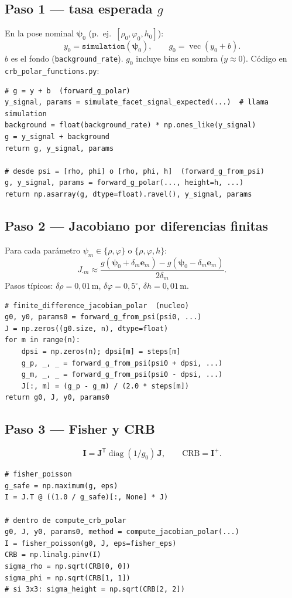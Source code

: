 \documentclass[11pt,a4paper]{article}
\theoremstyle{definition}
\newcommand{\vect}[1]{\boldsymbol{#1}}
\newcommand{\matr}[1]{\mathbf{#1}}
\DeclareMathOperator{\diag}{diag}
\begin{document}
\subsection{Paso 1 --- tasa esperada $g$}
En la pose nominal $\vect{\psi}_0$ (p.\ ej.\ $[\rho_0,\varphi_0,h_0]$):
\[
y_0=\texttt{simulation}(\vect{\psi}_0),\qquad
g_0=\operatorname{vec}(y_0+b).
\]
$b$ es el fondo (\texttt{background\_rate}). $g_0$ incluye bins en sombra
($y\approx 0$). C\'odigo en \texttt{crb\_polar\_functions.py}:
\begin{lstlisting}
# g = y + b  (forward_g_polar)
y_signal, params = simulate_facet_signal_expected(...)  # llama simulation
background = float(background_rate) * np.ones_like(y_signal)
g = y_signal + background
return g, y_signal, params

# desde psi = [rho, phi] o [rho, phi, h]  (forward_g_from_psi)
g, y_signal, params = forward_g_polar(..., height=h, ...)
return np.asarray(g, dtype=float).ravel(), y_signal, params
\end{lstlisting}

\subsection{Paso 2 --- Jacobiano por diferencias finitas}
Para cada par\'ametro $\psi_m\in\{\rho,\varphi\}$ o $\{\rho,\varphi,h\}$:
\begin{equation}
    J_{\cdot m}
    \approx
    \frac{
        g(\vect{\psi}_0+\delta_m\vect{e}_m)
        -
        g(\vect{\psi}_0-\delta_m\vect{e}_m)
    }{2\delta_m}.
\end{equation}
Pasos t\'ipicos: $\delta\rho=0{,}01\,\mathrm{m}$,
$\delta\varphi=0{,}5^\circ$, $\delta h=0{,}01\,\mathrm{m}$.
\begin{lstlisting}
# finite_difference_jacobian_polar  (nucleo)
g0, y0, params0 = forward_g_from_psi(psi0, ...)
J = np.zeros((g0.size, n), dtype=float)
for m in range(n):
    dpsi = np.zeros(n); dpsi[m] = steps[m]
    g_p, _, _ = forward_g_from_psi(psi0 + dpsi, ...)
    g_m, _, _ = forward_g_from_psi(psi0 - dpsi, ...)
    J[:, m] = (g_p - g_m) / (2.0 * steps[m])
return g0, J, y0, params0
\end{lstlisting}

\subsection{Paso 3 --- Fisher y CRB}
\begin{equation}
    \matr{I}
    =
    \matr{J}^{\mathsf T}\diag(1/g_0)\,\matr{J},
    \qquad
    \mathrm{CRB}
    =
    \matr{I}^{+}.
\end{equation}
\begin{lstlisting}
# fisher_poisson
g_safe = np.maximum(g, eps)
I = J.T @ ((1.0 / g_safe)[:, None] * J)

# dentro de compute_crb_polar
g0, J, y0, params0, method = compute_jacobian_polar(...)
I = fisher_poisson(g0, J, eps=fisher_eps)
CRB = np.linalg.pinv(I)
sigma_rho = np.sqrt(CRB[0, 0])
sigma_phi = np.sqrt(CRB[1, 1])
# si 3x3: sigma_height = np.sqrt(CRB[2, 2])
\end{lstlisting}
\end{document}
